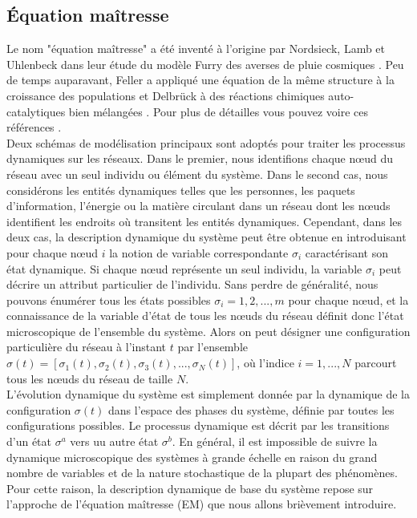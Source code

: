 \subsection{Équation maîtresse}
 
 
 
 
Le nom "équation maîtresse" a été inventé à l'origine par Nordsieck, Lamb et Uhlenbeck \cite{Nordsieck-al1940} dans leur étude du modèle Furry des averses de pluie cosmiques \cite{Furry1937}. Peu de temps auparavant, Feller a appliqué une équation de la même structure à la croissance des populations \cite{Feller1939} et Delbrück à des réactions chimiques auto-catalytiques bien mélangées \cite{Delbruck1940}. Pour plus de détailles vous pouvez voire ces références \cite{Kampen2007,Gardiner2009,Weber-Frey2017}.\\
Deux schémas de modélisation principaux sont adoptés pour traiter les processus dynamiques sur les réseaux. Dans le premier, nous identifions chaque nœud du réseau avec un seul individu ou élément du système. Dans le second cas, nous considérons les entités dynamiques telles que les personnes, les paquets d'information, l'énergie ou la matière circulant dans un réseau dont les nœuds identifient les endroits où transitent les entités dynamiques. Cependant, dans les deux cas, la description dynamique du système peut être obtenue en introduisant pour chaque nœud $i$ la notion de variable correspondante $\sigma_i$ caractérisant son état dynamique. Si chaque nœud représente un seul individu, la variable $\sigma_i$ peut décrire un attribut particulier de l'individu.
Sans perdre de généralité, nous pouvons énumérer tous les états possibles $\sigma_i=1, 2,. . ., m$ pour chaque nœud, et la connaissance de la variable d'état de tous les nœuds du réseau définit donc l'état microscopique de l'ensemble du système. Alors on peut désigner une configuration particulière du réseau à l'instant $t$ par l'ensemble $\sigma(t)=[\sigma_1(t),\sigma_2(t),\sigma_3(t), ...,\sigma_N(t)]$, où l'indice $i = 1,. . ., N$ parcourt tous les nœuds du réseau de taille $N$.\\
L'évolution dynamique du système est simplement donnée par la dynamique de la configuration $\sigma(t)$ dans l'espace des phases du système, définie par toutes les configurations possibles. Le processus dynamique est décrit par les transitions d'un état $\sigma^a$ vers uu autre état $\sigma^b$. En général, il est impossible de suivre la dynamique microscopique des systèmes à grande échelle en raison du grand nombre de variables et de la nature stochastique de la plupart des phénomènes. Pour cette raison, la description dynamique de base du système repose sur l'approche de l'équation maîtresse (EM) que nous allons brièvement introduire.\\
